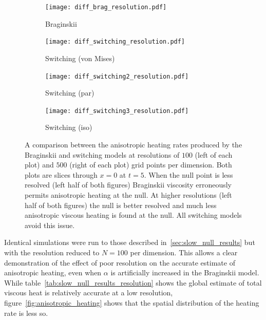 \begin{figure}[t]
    \hfill
    \begin{subfigure}{0.49\textwidth}
      \centering
      \texttt{[image: diff\_brag\_resolution.pdf]}
      \caption{Braginskii}%
      \label{fig:diff_brag_resolution}
    \end{subfigure}
    \hfill
    \begin{subfigure}{0.49\textwidth}
      \texttt{[image: diff\_switching\_resolution.pdf]}
      \caption{Switching (von Mises)}%
      \label{fig:diff_switching_resolution}
    \end{subfigure}
    \hfill
    \begin{subfigure}{0.49\textwidth}
      \texttt{[image: diff\_switching2\_resolution.pdf]}
      \caption{Switching (par)}%
      \label{fig:diff_switching2_resolution}
    \end{subfigure}
    \hfill
    \begin{subfigure}{0.49\textwidth}
      \texttt{[image: diff\_switching3\_resolution.pdf]}
      \caption{Switching (iso)}%
      \label{fig:diff_switching3_resolution}
    \end{subfigure}

    \caption{A comparison between the anisotropic heating rates produced by the Braginskii and switching models at resolutions of $100$ (left of each plot) and $500$ (right of each plot) grid points per dimension. Both plots are slices through $x=0$ at $t=5$. When the null point is less resolved (left half of both figures) Braginskii viscosity erroneously permits anisotropic heating at the null. At higher resolutions (left half of both figures) the null is better resolved and much less anisotropic viscous heating is found at the null. All switching models avoid this issue.}
\label{fig:anisotropy_bleeding}%
\end{figure}



Identical simulations were run to those described in~\ref{sec:slow_null_results} but with the resolution reduced to $N=100$ per dimension. This allows a clear demonstration of the effect of poor resolution on the accurate estimate of anisotropic heating, even when $\alpha$ is artificially increased in the Braginskii model. While table~\ref{tab:slow_null_results_resolution} shows the global estimate of total viscous heat is relatively accurate at a low resolution, figure~\ref{fig:anisotropic_heating} shows that the spatial distribution of the heating rate is less so.

